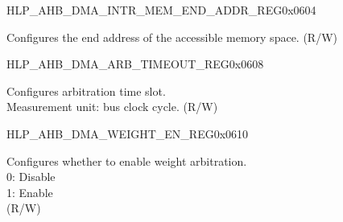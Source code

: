 \begin{register}{H}{LP\_AHB\_DMA\_INTR\_MEM\_END\_ADDR\_REG}{0x0604}\label{regdesc:LPAHBDMAINTRMEMENDADDRREG}
%
\regnewline%
\begin{regdesc}\begin{reglist}
\label{fielddesc:LPAHBDMAACCESSINTRMEMENDADDR}\item [LP\_AHB\_DMA\_ACCESS\_INTR\_MEM\_END\_ADDR] Configures the end address of the accessible memory space. (R/W)
\end{reglist}\end{regdesc}
\end{register}


\begin{register}{H}{LP\_AHB\_DMA\_ARB\_TIMEOUT\_REG}{0x0608}\label{regdesc:LPAHBDMAARBTIMEOUTREG}
%
%
\regnewline%
\begin{regdesc}\begin{reglist}
\label{fielddesc:LPAHBDMAARBTIMEOUT}\item [LP\_AHB\_DMA\_ARB\_TIMEOUT] Configures arbitration time slot.\\Measurement unit: bus clock cycle. (R/W)
\end{reglist}\end{regdesc}
\end{register}


\begin{register}{H}{LP\_AHB\_DMA\_WEIGHT\_EN\_REG}{0x0610}\label{regdesc:LPAHBDMAWEIGHTENREG}
%
%
\regnewline%
\begin{regdesc}\begin{reglist}
\label{fielddesc:LPAHBDMAWEIGHTEN}\item [LP\_AHB\_DMA\_WEIGHT\_EN] Configures whether to enable weight arbitration.\\0: Disable\\1: Enable\\ (R/W)
\end{reglist}\end{regdesc}
\end{register}



